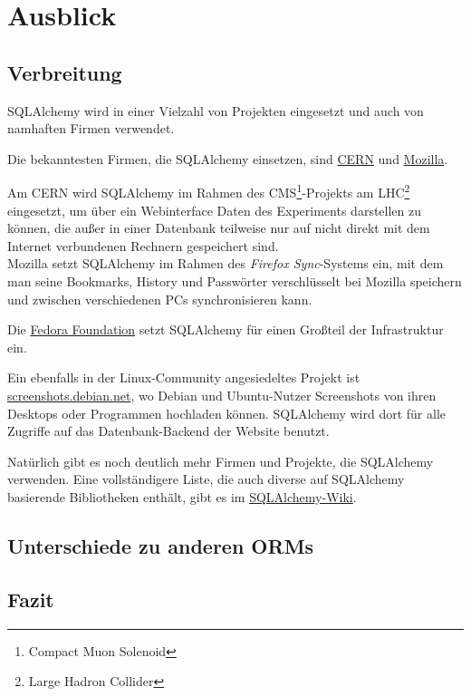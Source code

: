 \chapter{Ausblick}

\section{Verbreitung}

SQLAlchemy wird in einer Vielzahl von Projekten eingesetzt und auch von
namhaften Firmen verwendet.

Die bekanntesten Firmen, die SQLAlchemy einsetzen, sind
\href{http://www.cern.ch}{CERN} und
\href{http://www.mozilla.com}{Mozilla}.

Am CERN wird SQLAlchemy im Rahmen des CMS\footnote{Compact Muon
Solenoid}-Projekts am LHC\footnote{Large Hadron Collider} eingesetzt, um über
ein Webinterface Daten des Experiments darstellen zu können, die außer in einer
Datenbank teilweise nur auf nicht direkt mit dem Internet verbundenen Rechnern
gespeichert sind. \\
Mozilla setzt SQLAlchemy im Rahmen des \emph{Firefox Sync}-Systems ein, mit dem
man seine Bookmarks, History und Passwörter verschlüsselt bei Mozilla speichern
und zwischen verschiedenen PCs synchronisieren kann.

Die \href{http://fedoraproject.org/wiki/Infrastructure/Services}{Fedora
Foundation} setzt SQLAlchemy für einen Großteil der Infrastruktur ein.

Ein ebenfalls in der Linux-Community angesiedeltes Projekt ist
\href{http://screenshots.debian.net/}{screenshots.debian.net}, wo Debian
und Ubuntu-Nutzer Screenshots von ihren Desktops oder Programmen hochladen
können. SQLAlchemy wird dort für alle Zugriffe auf das Datenbank-Backend der
Website benutzt.

Natürlich gibt es noch deutlich mehr Firmen und Projekte, die SQLAlchemy
verwenden. Eine vollständigere Liste, die auch diverse auf SQLAlchemy basierende
Bibliotheken enthält, gibt es im
\href{http://www.sqlalchemy.org/trac/wiki/SAApps}{SQLAlchemy-Wiki}.

\section{Unterschiede zu anderen ORMs}

\section{Fazit}

